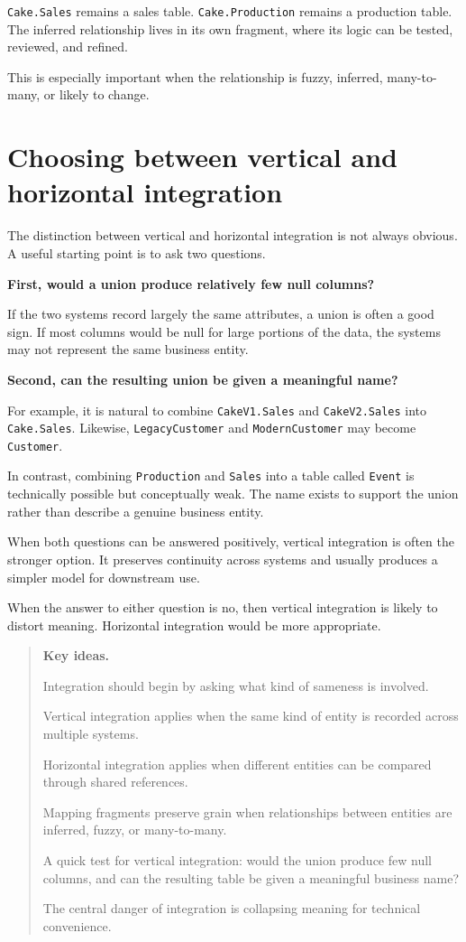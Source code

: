 \documentclass[10pt,openany,10pt]{book}
\begin{document}
\texttt{Cake.Sales} remains a sales table. \texttt{Cake.Production}
remains a production table. The inferred relationship lives in its own
fragment, where its logic can be tested, reviewed, and refined.

This is especially important when the relationship is fuzzy, inferred,
many-to-many, or likely to change.

\section{Choosing between vertical and horizontal
integration}\label{choosing-between-vertical-and-horizontal-integration}

The distinction between vertical and horizontal integration is not
always obvious. A useful starting point is to ask two questions.

\textbf{First, would a union produce relatively few null columns?}

If the two systems record largely the same attributes, a union is often
a good sign. If most columns would be null for large portions of the
data, the systems may not represent the same business entity.

\textbf{Second, can the resulting union be given a meaningful name?}

For example, it is natural to combine \texttt{CakeV1.Sales} and
\texttt{CakeV2.Sales} into \texttt{Cake.Sales}. Likewise,
\texttt{LegacyCustomer} and \texttt{ModernCustomer} may become
\texttt{Customer}.

In contrast, combining \texttt{Production} and \texttt{Sales} into a
table called \texttt{Event} is technically possible but conceptually
weak. The name exists to support the union rather than describe a
genuine business entity.

When both questions can be answered positively, vertical integration is
often the stronger option. It preserves continuity across systems and
usually produces a simpler model for downstream use.

When the answer to either question is no, then vertical integration is
likely to distort meaning. Horizontal integration would be more
appropriate.

\begin{quote}
\textbf{Key ideas.}

Integration should begin by asking what kind of sameness is involved.

Vertical integration applies when the same kind of entity is recorded
across multiple systems.

Horizontal integration applies when different entities can be compared
through shared references.

Mapping fragments preserve grain when relationships between entities are
inferred, fuzzy, or many-to-many.

A quick test for vertical integration: would the union produce few null
columns, and can the resulting table be given a meaningful business
name?

The central danger of integration is collapsing meaning for technical
convenience.
\end{quote}
\end{document}
